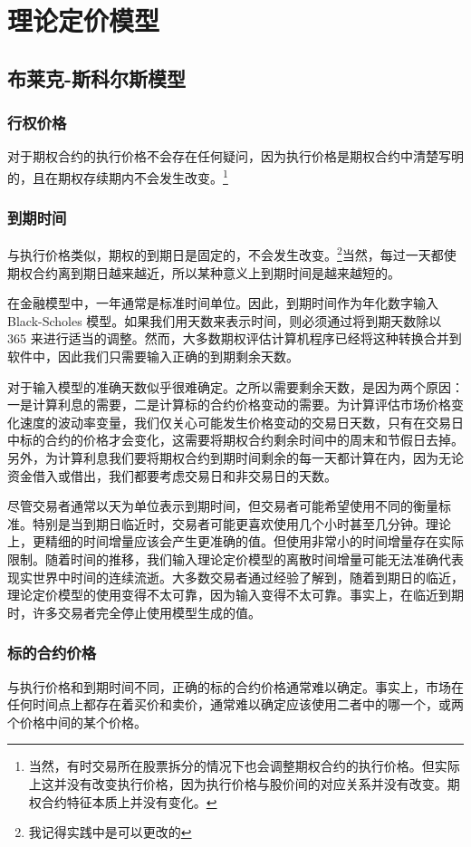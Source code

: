 \chapter{理论定价模型}
\section{布莱克-斯科尔斯模型}
\subsection{行权价格}
对于期权合约的执行价格不会存在任何疑问，因为执行价格是期权合约中清楚写明的，且在期权存续期内不会发生改变。\footnote{当然，有时交易所在股票拆分的情况下也会调整期权合约的执行价格。但实际上这并没有改变执行价格，因为执行价格与股价间的对应关系并没有改变。期权合约特征本质上并没有变化。}
\subsection{到期时间}
与执行价格类似，期权的到期日是固定的，不会发生改变。\footnote{我记得实践中是可以更改的}当然，每过一天都使期权合约离到期日越来越近，所以某种意义上到期时间是越来越短的。

在金融模型中，一年通常是标准时间单位。因此，到期时间作为年化数字输入 Black-Scholes 模型。如果我们用天数来表示时间，则必须通过将到期天数除以 365 来进行适当的调整。然而，大多数期权评估计算机程序已经将这种转换合并到软件中，因此我们只需要输入正确的到期剩余天数。

对于输入模型的准确天数似乎很难确定。之所以需要剩余天数，是因为两个原因：一是计算利息的需要，二是计算标的合约价格变动的需要。为计算评估市场价格变化速度的波动率变量，我们仅关心可能发生价格变动的交易日天数，只有在交易日中标的合约的价格才会变化，这需要将期权合约剩余时间中的周末和节假日去掉。另外，为计算利息我们要将期权合约到期时间剩余的每一天都计算在内，因为无论资金借入或借出，我们都要考虑交易日和非交易日的天数。

尽管交易者通常以天为单位表示到期时间，但交易者可能希望使用不同的衡量标准。特别是当到期日临近时，交易者可能更喜欢使用几个小时甚至几分钟。理论上，更精细的时间增量应该会产生更准确的值。但使用非常小的时间增量存在实际限制。随着时间的推移，我们输入理论定价模型的离散时间增量可能无法准确代表现实世界中时间的连续流逝。大多数交易者通过经验了解到，随着到期日的临近，理论定价模型的使用变得不太可靠，因为输入变得不太可靠。事实上，在临近到期时，许多交易者完全停止使用模型生成的值。
\subsection{标的合约价格}
与执行价格和到期时间不同，正确的标的合约价格通常难以确定。事实上，市场在任何时间点上都存在着买价和卖价，通常难以确定应该使用二者中的哪一个，或两个价格中间的某个价格。

